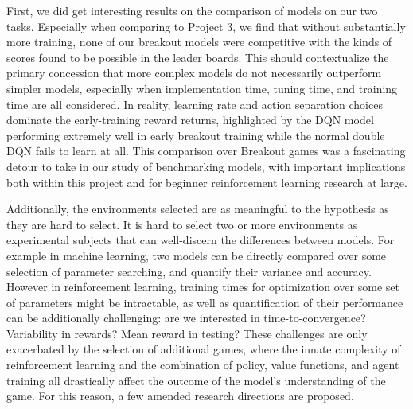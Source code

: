 \documentclass[conference]{IEEEtran}
\begin{document}
First, we did get interesting results on the comparison of models on our two tasks. Especially when comparing to Project 3, we find that without substantially more training, none of our breakout models were competitive with the kinds of scores found to be possible in the leader boards. This should contextualize the primary concession that more complex models do not necessarily outperform simpler models, especially when implementation time, tuning time, and training time are all considered. In reality, learning rate and action separation choices dominate the early-training reward returns, highlighted by the DQN model performing extremely well in early breakout training while the normal double DQN fails to learn at all. This comparison over Breakout games was a fascinating detour to take in our study of benchmarking models, with important implications both within this project and for beginner reinforcement learning research at large.

Additionally, the environments selected are as meaningful to the hypothesis as they are hard to select. It is hard to select two or more environments as experimental subjects that can well-discern the differences between models. For example in machine learning, two models can be directly compared over some selection of parameter searching, and quantify their variance and accuracy. However in reinforcement learning, training times for optimization over some set of parameters might be intractable, as well as quantification of their performance can be additionally challenging: are we interested in time-to-convergence? Variability in rewards? Mean reward in testing? These challenges are only exacerbated by the selection of additional games, where the innate complexity of reinforcement learning and the combination of policy, value functions, and agent training all drastically affect the outcome of the model's understanding of the game. For this reason, a few amended research directions are proposed.
\end{document}
